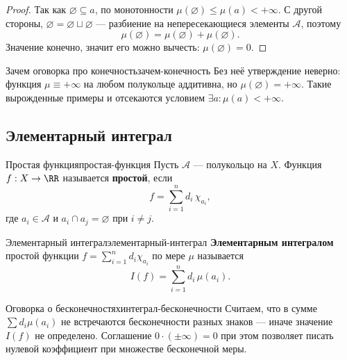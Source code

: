 \begin{proof}
	Так как $\varnothing \subseteq a$, по монотонности
	$\mu(\varnothing) \leq \mu(a) < +\infty$. С другой стороны,
	$\varnothing = \varnothing \sqcup \varnothing$ --- разбиение на
	непересекающиеся элементы $\mathcal{A}$, поэтому
	\[
	\mu(\varnothing) = \mu(\varnothing) + \mu(\varnothing).
	\]
	Значение конечно, значит его можно вычесть: $\mu(\varnothing) = 0$.
\end{proof}

\begin{Remark}{Зачем оговорка про конечность}{зачем-конечность}
	Без неё утверждение неверно: функция $\mu \equiv +\infty$ на любом
	полукольце аддитивна, но $\mu(\varnothing) = +\infty$. Такие вырожденные
	примеры и отсекаются условием $\exists a \colon \mu(a) < +\infty$.
\end{Remark}

\subsection{Элементарный интеграл}

\begin{Definition}{Простая функция}{простая-функция}
	Пусть $\mathcal{A}$ --- полукольцо на $X$. Функция $f : X \to \RR$
	называется \textbf{простой}, если
	\[
	f = \sum_{i=1}^{n} d_i\, \chi_{a_i},
	\]
	где $a_i \in \mathcal{A}$ и $a_i \cap a_j = \varnothing$ при $i \neq j$.
\end{Definition}

\begin{Definition}{Элементарный интеграл}{элементарный-интеграл}
	\textbf{Элементарным интегралом} простой функции
	$f = \sum_{i=1}^{n} d_i \chi_{a_i}$ по мере $\mu$ называется
	\[
	I(f) = \sum_{i=1}^{n} d_i\, \mu(a_i).
	\]
\end{Definition}

\begin{Remark}{Оговорка о бесконечностях}{интеграл-бесконечности}
	Считаем, что в сумме $\sum d_i \mu(a_i)$ не встречаются бесконечности
	разных знаков --- иначе значение $I(f)$ не определено. Соглашение
	$0\cdot(\pm\infty) = 0$ при этом позволяет писать нулевой коэффициент
	при множестве бесконечной меры.
\end{Remark}

